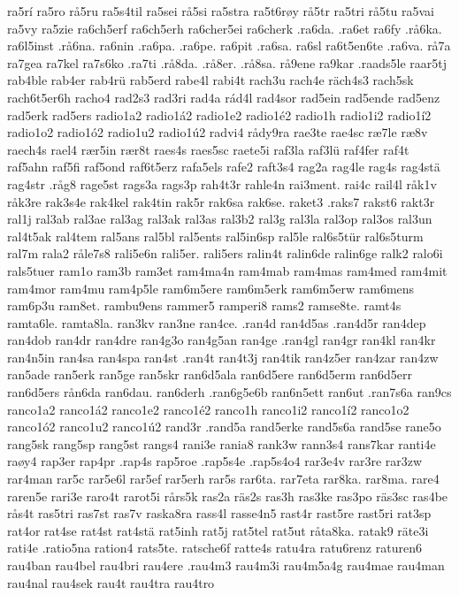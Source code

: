 {{ra5rí
ra5ro
rå5ru
ra5s4til
ra5sei
rå5si
ra5stra
ra5t6røy
rå5tr
ra5tri
rå5tu
ra5vai
ra5vy
ra5zie
ra6ch5erf
ra6ch5erh
ra6cher5ei
ra6cherk
.ra6da.
.ra6et
ra6fy
.rå6ka.
ra6l5inst
.rå6na.
ra6nin
.ra6pa.
.ra6pe.
ra6pit
.ra6sa.
ra6sl
ra6t5en6te
.ra6va.
rå7a
ra7gea
ra7kel
ra7s6ko
.ra7ti
.rå8da.
.rå8er.
.rå8sa.
rå9ene
ra9kar
.raads5le
raar5tj
rab4ble
rab4er
rab4rü
rab5erd
rabe4l
rabi4t
rach3u
rach4e
räch4s3
rach5sk
rach6t5er6h
racho4
rad2s3
rad3ri
rad4a
rád4l
rad4sor
rad5ein
rad5ende
rad5enz
rad5erk
rad5ers
radio1a2
radio1á2
radio1e2
radio1é2
radio1h
radio1i2
radio1í2
radio1o2
radio1ó2
radio1u2
radio1ú2
radvi4
rådy9ra
rae3te
rae4sc
ræ7le
ræ8v
raech4s
rael4
rær5in
rær8t
raes4s
raes5sc
raete5i
raf3la
raf3lü
raf4fer
raf4t
raf5ahn
raf5fi
raf5ond
raf6t5erz
rafa5els
rafe2
raft3s4
rag2a
rag4le
rag4s
rag4stä
rag4str
.råg8
rage5st
rags3a
rags3p
rah4t3r
rahle4n
rai3ment.
rai4c
rail4l
råk1v
råk3re
rak3s4e
rak4kel
rak4tin
rak5r
rak6sa
rak6se.
raket3
.raks7
rakst6
rakt3r
ral1j
ral3ab
ral3ae
ral3ag
ral3ak
ral3as
ral3b2
ral3g
ral3la
ral3op
ral3os
ral3un
ral4t5ak
ral4tem
ral5ans
ral5bl
ral5ents
ral5in6sp
ral5le
ral6s5tür
ral6s5turm
ral7m
rala2
råle7s8
rali5e6n
rali5er.
rali5ers
ralin4t
ralin6de
ralin6ge
ralk2
ralo6i
rals5tuer
ram1o
ram3b
ram3et
ram4ma4n
ram4mab
ram4mas
ram4med
ram4mit
ram4mor
ram4mu
ram4p5le
ram6m5ere
ram6m5erk
ram6m5erw
ram6mens
ram6p3u
ram8et.
rambu9ens
rammer5
ramperi8
rams2
ramse8te.
ramt4s
ramta6le.
ramta8la.
ran3kv
ran3ne
ran4ce.
.ran4d
ran4d5as
.ran4d5r
ran4dep
ran4dob
ran4dr
ran4dre
ran4g3o
ran4g5an
ran4ge
.ran4gl
ran4gr
ran4kl
ran4kr
ran4n5in
ran4sa
ran4spa
ran4st
.ran4t
ran4t3j
ran4tik
ran4z5er
ran4zar
ran4zw
ran5ade
ran5erk
ran5ge
ran5skr
ran6d5ala
ran6d5ere
ran6d5erm
ran6d5err
ran6d5ers
rån6da
ran6dau.
ran6derh
.ran6g5e6b
ran6n5ett
ran6ut
.ran7s6a
ran9cs
ranco1a2
ranco1á2
ranco1e2
ranco1é2
ranco1h
ranco1i2
ranco1í2
ranco1o2
ranco1ó2
ranco1u2
ranco1ú2
rand3r
.rand5a
rand5erke
rand5s6a
rand5se
rane5o
rang5sk
rang5sp
rang5st
rangs4
rani3e
rania8
rank3w
rann3s4
rans7kar
ranti4e
raøy4
rap3er
rap4pr
.rap4s
rap5roe
.rap5s4e
.rap5s4o4
rar3e4v
rar3re
rar3zw
rar4man
rar5c
rar5e6l
rar5ef
rar5erh
rar5s
rar6ta.
rar7eta
rar8ka.
rar8ma.
rare4
raren5e
rari3e
raro4t
rarot5i
rårs5k
ras2a
räs2s
ras3h
ras3ke
ras3po
räs3sc
ras4be
rås4t
ras5tri
ras7st
ras7v
raska8ra
rass4l
rasse4n5
rast4r
rast5re
rast5ri
rat3sp
rat4or
rat4se
rat4st
rat4stä
rat5inh
rat5j
rat5tel
rat5ut
råta8ka.
ratak9
räte3i
rati4e
.ratio5na
ration4
rats5te.
ratsche6f
ratte4s
ratu4ra
ratu6renz
raturen6
rau4ban
rau4bel
rau4bri
rau4ere
.rau4m3
rau4m3i
rau4m5a4g
rau4mae
rau4man
rau4nal
rau4sek
rau4t
rau4tra
rau4tro
}}
